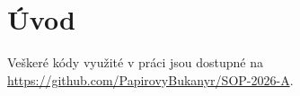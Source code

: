 \documentclass[../sablona-main.tex]{subfiles}
\begin{document}
\section*{Úvod}

Veškeré kódy využité v práci jsou dostupné na \href{https://github.com/PapirovyBukanyr/SOP-2026-A}{https://github.com/PapirovyBukanyr/SOP-2026-A}.
\end{document}
